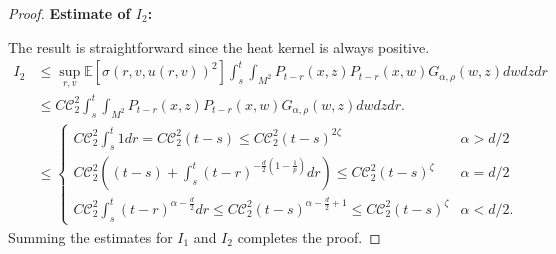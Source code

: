 \documentclass[12pt]{amsart}
\numberwithin{equation}{section}
\newcommand{\1}{\mathbf{1}}
\begin{document}
\begin{proof}
\textbf{Estimate of $I_2$:}

The result is straightforward since the heat kernel is always positive. 
\begin{equation*}
\label{I2}
\begin{split}
I_2&\leq \sup_{r,v}\mathbb{E}\left[\sigma(r,v,u(r,v))^2\right]\int_s^t\int_{M^2}P_{t-r}(x,z)P_{t-r}(x,w)G_{\alpha,\rho}(w,z)dwdzdr\\
&\leq C\mathcal{C}_2^2\int_s^t\int_{M^2}P_{t-r}(x,z)P_{t-r}(x,w)G_{\alpha,\rho}(w,z)dwdzdr.\\
&\leq\begin{cases}
    C\mathcal{C}_2^2\int_s^t1dr=C\mathcal{C}_2^2(t-s)\leq C\mathcal{C}_2^2(t-s)^{2\zeta}&\alpha>d/2\\
    C\mathcal{C}_2^2\left((t-s)+\int_s^t(t-r)^{-\frac{d}{2}(1-\frac{1}{p})}dr\right)\leq C\mathcal{C}_2^2(t-s)^{\zeta}&\alpha=d/2\\
    C\mathcal{C}_2^2\int_s^t(t-r)^{\alpha-\frac{d}{2}}dr\leq C\mathcal{C}_2^2(t-s)^{\alpha-\frac{d}{2}+1}\leq C\mathcal{C}_2^2(t-s)^{\zeta}&\alpha<d/2.
\end{cases}
\end{split}
\end{equation*}
Summing the estimates for $I_1$ and $I_2$ completes the proof.
\end{proof}
\end{document}

